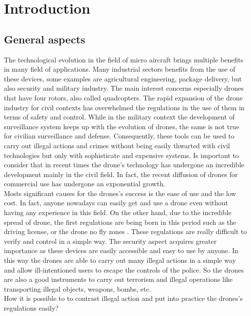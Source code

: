 \chapter{Introduction}
\section{General aspects}
The technological evolution in the field of micro aircraft brings multiple benefits in many field of applications. Many industrial sectors benefits from the use of these devices, some examples are agricultural engineering, package delivery, but also security and military industry. The main interest concerns especially drones that have four rotors, also called quadcopters. The rapid expansion of the drone industry for civil contexts has overwhelmed the regulations in the use of them in terms of safety and control. While in the military context the development of surveillance system keeps up with the evolution of drones, the same is not true for civilian surveillance and defense. Consequently, these tools can be used to carry out illegal actions and crimes without being easily thwarted with civil technologies but only with sophisticate and expensive systems. Is important to consider that in recent times the drone's technology has undergone an incredible development mainly in the civil field. In fact, the recent diffusion of drones for commercial use has undergone an exponential growth. \\ Mosts significant causes for the drones's success is the ease of use and the low cost. In fact, anyone nowadays can easily get and use a drone even without having any experience in this field. On the other hand, due to the incredible spread of drone, the first regulations are being born in this period such as the driving license, or the drone no fly zones \cite{survey}. These regulations are really difficult to verify and control in a simple way. The security aspect acquires greater importance as these devices are easily accessible and easy to use by anyone. In this way the drones are able to carry out many illegal actions in a simple way and allow ill-intentioned users to escape the controls of the police. So the drones are also a good instruments to carry out terrorism and illegal operations like transporting illegal objects, weapons, bombs, etc.\\ How it is possible to to contrast illegal action and put into practice the drones's regulations easily?\\
